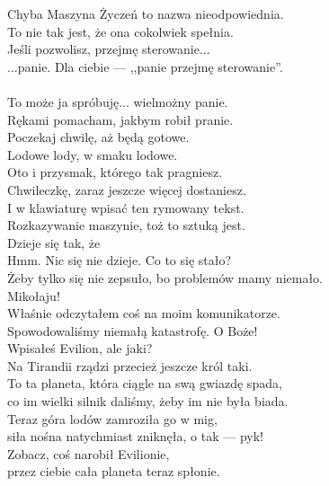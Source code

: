 \charprzy{}
Chyba Maszyna Życzeń to nazwa nieodpowiednia.\\
To nie tak jest, że ona cokolwiek spełnia.\\
Jeśli pozwolisz, przejmę sterowanie...\\

\chardok{}
...panie.
Dla ciebie --- ,,panie przejmę sterowanie''.\\

\\

\charmik{}
To może ja spróbuję... wielmożny panie.\\
Rękami pomacham, jakbym robił pranie.\\
Poczekaj chwilę, aż będą gotowe.\\
Lodowe lody, w smaku lodowe.\\
Oto i przysmak, którego tak pragniesz.\\
Chwileczkę, zaraz jeszcze więcej dostaniesz.\\
I w klawiaturę wpisać ten rymowany tekst.\\
Rozkazywanie maszynie, toż to sztuką jest.\\
Dzieje się tak, że \\
Hmm. Nic się nie dzieje. Co to się stało?\\
Żeby tylko się nie zepsuło, bo problemów mamy niemało.\\

\charnad{}
Mikołaju!\\
Właśnie odczytałem coś na moim komunikatorze. \\
Spowodowaliśmy niemałą katastrofę. O Boże!\\
Wpisałeś Evilion, ale jaki?\\
Na Tirandii rządzi przecież jeszcze król taki.\\
To ta planeta, która ciągle na swą gwiazdę spada,\\
co im wielki silnik daliśmy, żeby im nie była biada.\\
Teraz góra lodów zamroziła go w mig,\\
siła nośna natychmiast zniknęła, o tak --- pyk!\\

\charmik{}
Zobacz, coś narobił Evilionie,\\
przez ciebie cała planeta teraz spłonie.\\

